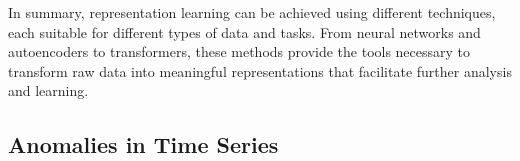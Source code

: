 In summary, representation learning can be achieved using different techniques, each suitable for different types of data and tasks. From neural networks and autoencoders to transformers, these methods provide the tools necessary to transform raw data into meaningful representations that facilitate further analysis and learning.

\subsection{Anomalies in Time Series}

